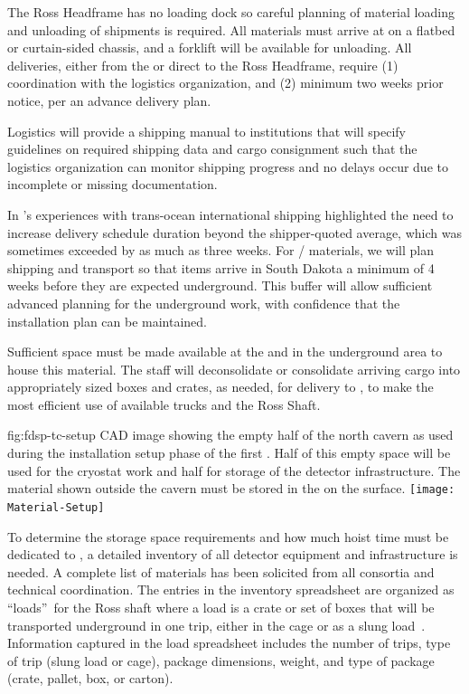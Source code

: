 The Ross Headframe has no loading dock so careful planning of material loading and unloading of shipments is required. 
All materials must arrive at  on a flatbed or curtain-sided chassis, and a forklift will be available for unloading. 
All deliveries, either from the  or direct to the Ross Headframe, require (1) coordination with the logistics organization, and (2) minimum two weeks prior notice, per an advance delivery plan.  
 
Logistics will provide a shipping manual to  institutions that  
will specify guidelines on required shipping data and cargo consignment such that the logistics organization can monitor shipping progress and no delays occur due to incomplete or missing documentation. 


In 's experiences with trans-ocean international shipping highlighted the need to increase delivery schedule duration beyond the shipper-quoted average, which was sometimes exceeded by as much as three weeks. For / materials, we will plan shipping and transport so that items arrive in South Dakota a minimum of 4 weeks before they are expected underground. This buffer will allow sufficient advanced planning for the underground work, with confidence that the installation plan can be maintained.


Sufficient space must be made available at the  and in the underground area  to house this material.
The  staff will deconsolidate or consolidate arriving cargo into appropriately sized boxes and crates, as needed, for delivery to , to make the most efficient use of available trucks and the Ross Shaft. 

\begin{dunefigure}{fig:fdsp-tc-setup}
  {CAD image showing the empty half of the north cavern as used during the installation setup phase of the first .  Half of this empty space will be used for the cryostat work and half for storage of the detector infrastructure. The material shown outside the cavern must be stored in the  on the surface.}
\texttt{[image: Material-Setup]}
\end{dunefigure}


To determine the storage space requirements and how much hoist time must be dedicated to , a detailed inventory of all   detector equipment and infrastructure is needed. 
A complete list of materials has been solicited from all consortia and technical coordination. 
The entries in the inventory spreadsheet are organized as \textquotedblleft loads\textquotedblright \ for the Ross shaft where a load is a crate or set of boxes that will be transported underground in one trip, either in the cage or as a slung load~\cite{bib:docdb8426}. 
Information captured in the load spreadsheet includes the number of  
trips, type of trip (slung load or cage), package dimensions, weight, and type of package (crate, pallet, box, or carton). 

